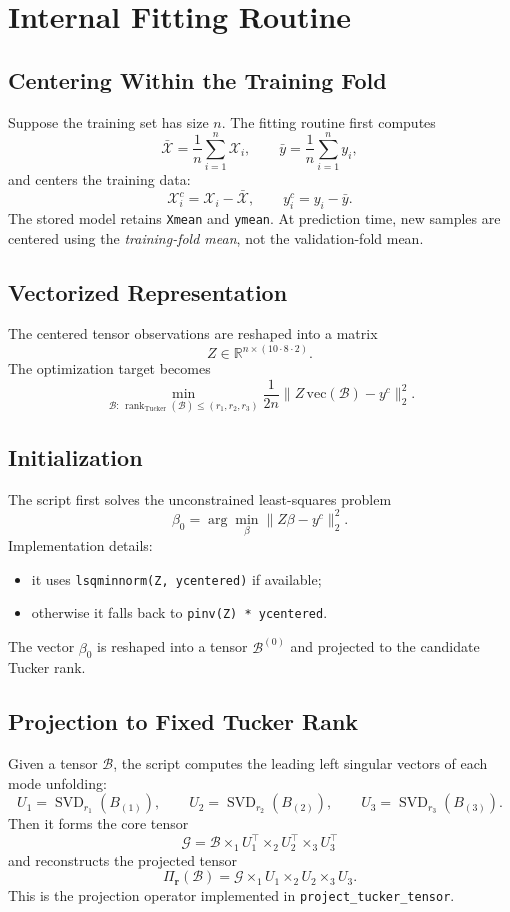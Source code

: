 \documentclass[11pt]{article}
\begin{document}
\section{Internal Fitting Routine}
\subsection{Centering Within the Training Fold}
Suppose the training set has size $n$. The fitting routine first computes
\[
\bar{\mathcal X}
=
\frac{1}{n}\sum_{i=1}^n \mathcal X_i,
\qquad
\bar y
=
\frac{1}{n}\sum_{i=1}^n y_i,
\]
and centers the training data:
\[
\mathcal X_i^c=\mathcal X_i-\bar{\mathcal X},
\qquad
y_i^c=y_i-\bar y.
\]
The stored model retains \texttt{Xmean} and \texttt{ymean}. At prediction time, new samples are centered using the \emph{training-fold mean}, not the validation-fold mean.

\subsection{Vectorized Representation}
The centered tensor observations are reshaped into a matrix
\[
Z\in\mathbb{R}^{n\times (10\cdot 8\cdot 2)}.
\]
The optimization target becomes
\[
\min_{\mathcal B:\,\operatorname{rank}_{\mathrm{Tucker}}(\mathcal B)\le (r_1,r_2,r_3)}
\frac{1}{2n}\|Z\,\mathrm{vec}(\mathcal B)-y^c\|_2^2.
\]

\subsection{Initialization}
The script first solves the unconstrained least-squares problem
\[
\beta_0
=
\arg\min_{\beta}\|Z\beta-y^c\|_2^2.
\]
Implementation details:
\begin{itemize}[leftmargin=2em]
\item it uses \texttt{lsqminnorm(Z, ycentered)} if available;
\item otherwise it falls back to \texttt{pinv(Z) * ycentered}.
\end{itemize}
The vector $\beta_0$ is reshaped into a tensor $\mathcal B^{(0)}$ and projected to the candidate Tucker rank.

\subsection{Projection to Fixed Tucker Rank}
Given a tensor $\mathcal B$, the script computes the leading left singular vectors of each mode unfolding:
\[
U_1=\operatorname{SVD}_{r_1}(B_{(1)}),\qquad
U_2=\operatorname{SVD}_{r_2}(B_{(2)}),\qquad
U_3=\operatorname{SVD}_{r_3}(B_{(3)}).
\]
Then it forms the core tensor
\[
\mathcal G
=
\mathcal B\times_1 U_1^\top\times_2 U_2^\top\times_3 U_3^\top
\]
and reconstructs the projected tensor
\[
\Pi_{\mathbf r}(\mathcal B)
=
\mathcal G\times_1 U_1\times_2 U_2\times_3 U_3.
\]
This is the projection operator implemented in \texttt{project\_tucker\_tensor}.
\end{document}

